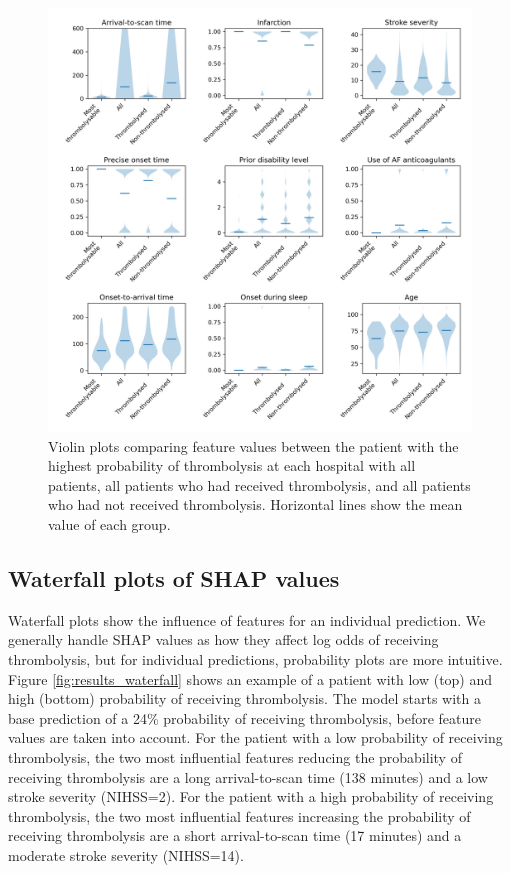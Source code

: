 \begin{figure}
\centering
\includegraphics[width=1.0\textwidth]{./images/02a_most_thrombolsyable_violin}
\caption{Violin plots comparing feature values between the patient with the highest probability of thrombolysis at each hospital with all patients, all patients who had received thrombolysis, and all patients who had not received thrombolysis. Horizontal lines show the mean value of each group.}
\label{fig:results_most_thrombolysable}
\end{figure}


\subsection{Waterfall plots of SHAP values}

Waterfall plots show the influence of features for an individual prediction. We generally handle SHAP values as how they affect log odds of receiving thrombolysis, but for individual predictions, probability plots are more intuitive. Figure \ref{fig:results_waterfall} shows an example of a patient with low (top) and high (bottom) probability of receiving thrombolysis. The model starts with a base prediction of a 24\% probability of receiving thrombolysis, before feature values are taken into account. For the patient with a low probability of receiving thrombolysis, the two most influential features reducing the probability of receiving thrombolysis are a long arrival-to-scan time (138 minutes) and a low stroke severity (NIHSS=2). For the patient with a high probability of receiving thrombolysis, the two most influential features increasing the probability of receiving thrombolysis are a short arrival-to-scan time (17 minutes) and a moderate stroke severity (NIHSS=14). 

